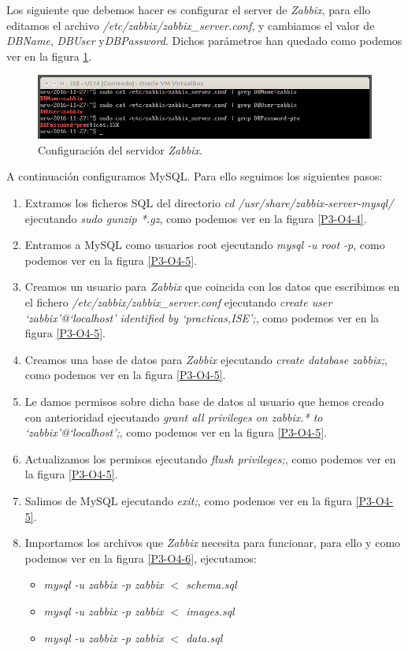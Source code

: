 \documentclass[a4paper,titlepage,12pt]{report}	%
\numberwithin{figure}{section} %
\numberwithin{table}{section} %
\begin{document}
	Los siguiente que debemos hacer es configurar el server de \textit{Zabbix}, para ello editamos el archivo \textit{/etc/zabbix/zabbix\_server.conf}, y cambiamos el valor de \textit{DBName}, \textit{DBUser} y\textit{DBPassword}. Dichos parámetros han quedado como podemos ver en la figura \ref{P3-O4-3}.

	\begin{figure}[H]
	   \includegraphics[width=\linewidth]{./Imagenes/P3/O4-3.png}
	   \vspace{-0.5cm}
	   \caption[Configuración del servidor de \textit{Zabbix}.]{Configuración del servidor \textit{Zabbix}.}
	   \label{P3-O4-3}
	\end{figure}

	A continuación configuramos MySQL. Para ello seguimos los siguientes pasos:
	\begin{enumerate}
	   \item Extramos los ficheros SQL del directorio \textit{cd /usr/share/zabbix-server-mysql/} ejecutando \textit{sudo gunzip *.gz}, como podemos ver en la figura \ref{P3-O4-4}.
	   \item Entramos a MySQL como usuarios root ejecutando \textit{mysql -u root -p}, como podemos ver en la figura \ref{P3-O4-5}.
	   \item Creamos un usuario para \textit{Zabbix} que coincida con los datos que escribimos en el fichero \textit{/etc/zabbix/zabbix\_server.conf} ejecutando \textit{create user `zabbix'@`localhost' identified by `practicas,ISE';}, como podemos ver en la figura \ref{P3-O4-5}.
	   \item Creamos una base de datos para \textit{Zabbix} ejecutando \textit{create database zabbix;}, como podemos ver en la figura \ref{P3-O4-5}.
	   \item Le damos permisos sobre dicha base de datos al usuario que hemos creado con anterioridad ejecutando \textit{grant all privileges on zabbix.* to `zabbix'@`localhost';}, como podemos ver en la figura \ref{P3-O4-5}.
	   \item Actualizamos los permisos ejecutando \textit{flush privileges;}, como podemos ver en la figura \ref{P3-O4-5}.
	   \item Salimos de MySQL ejecutando \textit{exit;}, como podemos ver en la figura \ref{P3-O4-5}.
	   \item Importamos los archivos que \textit{Zabbix} necesita para funcionar, para ello y como podemos ver en la figura \ref{P3-O4-6}, ejecutamos:
	      \begin{itemize}
	         \item \textit{mysql -u zabbix -p zabbix $<$ schema.sql}
	         \item \textit{mysql -u zabbix -p zabbix $<$ images.sql}
	         \item \textit{mysql -u zabbix -p zabbix $<$ data.sql}
	      \end{itemize}
	\end{enumerate}
\end{document}
